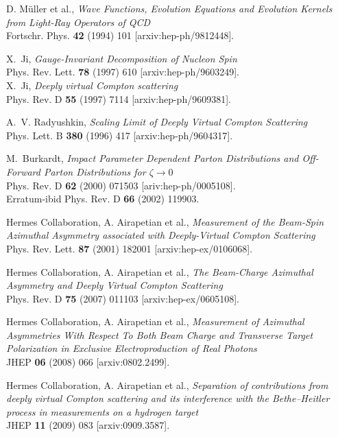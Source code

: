 \documentclass[11pt,a4paper]{article}
\begin{document}

\begin{thebibliography}{10}
D. M\"uller et al., \emph{Wave Functions, Evolution Equations and Evolution Kernels from Light-Ray Operators of QCD}
\\Fortschr. Phys. {\bf 42} (1994) 101 [arxiv:hep-ph/9812448]. 

X.~Ji, \emph{Gauge-Invariant Decomposition of Nucleon Spin}
\\Phys. Rev. Lett. {\bf 78} (1997) 610 [arxiv:hep-ph/9603249].\\

X.~Ji, \emph{Deeply virtual Compton scattering}
\\Phys. Rev. D \textbf{55} (1997) 7114 [arxiv:hep-ph/9609381].

A.~V. Radyushkin, \emph{Scaling Limit of Deeply Virtual Compton Scattering}
\\Phys. Lett. B \textbf{380} (1996) 417 [arxiv:hep-ph/9604317].

M.~Burkardt, \emph{Impact Parameter Dependent Parton Distributions and Off-Forward Parton Distributions for $\zeta\to 0$}
\\Phys. Rev. D \textbf{62} (2000) 071503 [ariv:hep-ph/0005108].
\\Erratum-ibid Phys. Rev. D \textbf{66} (2002) 119903. 

H{\sc ermes} Collaboration, A. Airapetian et al., \emph{Measurement of the Beam-Spin Azimuthal Asymmetry associated with Deeply-Virtual Compton Scattering}
\\Phys. Rev. Lett. \textbf{87} (2001) 182001 [arxiv:hep-ex/0106068].

H{\sc ermes} Collaboration, A. Airapetian et al., \emph{The Beam-Charge Azimuthal Asymmetry and Deeply Virtual Compton Scattering }
\\Phys. Rev. D \textbf{75} (2007) 011103 [arxiv:hep-ex/0605108].

H{\sc ermes} Collaboration, A. Airapetian et al., \emph{Measurement of Azimuthal Asymmetries With Respect To Both Beam Charge and Transverse Target Polarization in Exclusive Electroproduction of Real Photons}
\\JHEP \textbf{06} (2008) 066 [arxiv:0802.2499].

H{\sc ermes} Collaboration, A. Airapetian et al., \emph{Separation of contributions from deeply virtual Compton scattering and its interference with the Bethe--Heitler process in measurements on a hydrogen target}
\\JHEP {\bf 11} (2009) 083 [arxiv:0909.3587].


\end{thebibliography}
\end{document}
